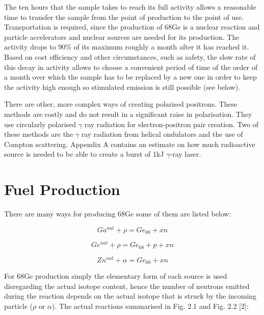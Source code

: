 The ten hours that the sample takes to reach its full activity allows a reasonable time to transfer the sample from the point of production to the point of use. Transportation is required, since the production of 68Ge is a nuclear reaction and particle accelerators and nuclear sources are needed for its production. The activity drops to 90\% of its maximum roughly a month after it has reached it. Based on cost efficiency and other circumstances, such as safety, the slow rate of this decay in activity allows to choose a convenient period of time of the order of a month over which the sample has to be replaced by a new one in order to keep the activity high enough so stimulated emission is still possible (see below).

There are other, more complex ways of creating polarised positrons. These methods are costly and do not result in a significant raise in polarisation. They use circularly polarised $\gamma$ ray radiation for electron-positron pair creation. Two of these methods are the $\gamma$ ray radiation from helical ondulators and the use of Compton scattering. Appendix A contains an estimate on how much radioactive source is needed to be able to create a burst of 1kJ $\gamma$-ray laser. 

\section{Fuel Production}

There are many ways for producing 68Ge some of them are listed below:

\begin{equation}
\label{e4}
Ga^{nat} + \rho = Ge_{68} + xn
\end{equation}

\begin{equation}
\label{e5}
Ge^{nat} + \rho = Ge_{68} + p + xn
\end{equation}

\begin{equation}
\label{e6}
Zn^{nat} + \alpha = Ge_{68} + xn
\end{equation}

For 68Ge production simply the elementary form of each source is used disregarding the actual isotope content, hence the number of neutrons emitted during the reaction depends on the actual isotope that is struck by the incoming particle ($\rho$ or $\alpha$).
The actual reactions summarised in Fig. 2.1 and Fig. 2.2 [2]:

